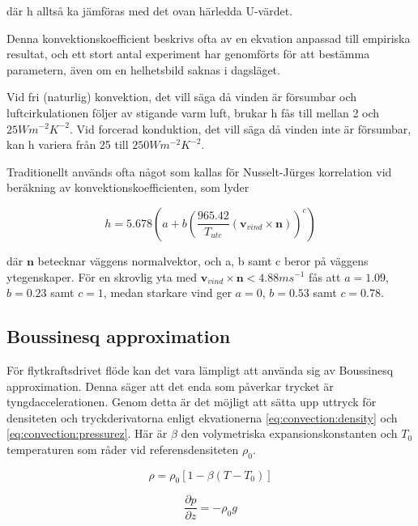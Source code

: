 där h alltså ka jämföras med det ovan härledda U-värdet. 

Denna konvektionskoefficient beskrivs ofta av en ekvation anpassad till empiriska resultat, och ett stort antal experiment har genomförts för att bestämma parametern, även om en helhetsbild saknas i dagsläget.

Vid fri (naturlig) konvektion, det vill säga då vinden är försumbar och luftcirkulationen följer av stigande varm luft, brukar h fås till mellan 2 och $\unit{25}{Wm^{-2}K^{-2}}$. Vid forcerad konduktion, det vill säga då vinden inte är försumbar, kan h variera från 25 till $\unit{250}{Wm^{-2}K^{-2}}$. \cite{ASHRAE09}

Traditionellt används ofta något som kallas för Nusselt-Jürges korrelation vid beräkning av konvektionskoefficienten, som lyder

\begin{equation}
h = 5.678 \left( a + b \left( \frac{965.42}{T_{ute}}\left(\mathbf{v}_{vind}\times \mathbf{n}\right) \right)^c \right)
\end{equation}

där $\mathbf{n}$ betecknar väggens normalvektor, och a, b samt c beror på väggens ytegenskaper. För en skrovlig yta med $\mathbf{v}_{vind}\times \mathbf{n} < \unit{4.88}{ms^{-1}}$ fås att $a=1.09$, $b=0.23$ samt $c=1$, medan starkare vind ger $a=0$, $b=0.53$ samt $c=0.78$. \cite{palyvos08}


\subsection{Boussinesq approximation}

För flytkraftsdrivet flöde kan det vara lämpligt att använda sig av
Boussinesq approximation. Denna säger att det enda som påverkar trycket är
tyngdaccelerationen. Genom detta är det möjligt att sätta upp uttryck för densiteten
och tryckderivatorna enligt ekvationerna \eqref{eq:convection:density}
och \eqref{eq:convection:pressurez}. Här är
$\beta$ den volymetriska expansionskonstanten och
$T_0$ temperaturen som råder vid referensdensiteten $\rho_0$.

\begin{equation}
\label{eq:convection:density}
\rho = \rho_0[1-\beta(T-T_0)]
\end{equation}

\begin{equation}
\label{eq:convection:pressurez}
\frac{\partial p}{\partial z} = -\rho_0g
\end{equation}


